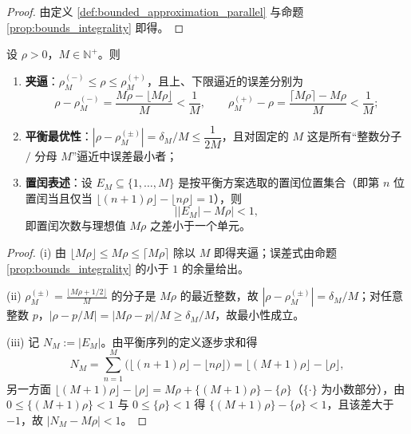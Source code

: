 \begin{proof}
由定义 \ref{def:bounded_approximation_parallel} 与命题 \ref{prop:bounds_integrality} 即得。
\end{proof}

\begin{theorem}[逼近误差的上下界]\label{thm:intercalation_error_bound_parallel}
设 $\rho>0$，$M\in\mathbb{N}^+$。则
\begin{enumerate}[label=(\roman*)]
    \item \textbf{夹逼}：$\rho^{(-)}_M\le\rho\le\rho^{(+)}_M$，且上、下限逼近的误差分别为
    \[
    \rho-\rho^{(-)}_M=\frac{M\rho-\lfloor M\rho\rfloor}{M}<\frac1M,
    \qquad
    \rho^{(+)}_M-\rho=\frac{\lceil M\rho\rceil-M\rho}{M}<\frac1M;
    \]
    \item \textbf{平衡最优性}：$|\rho-\rho^{(\pm)}_M|=\delta_M/M\le\dfrac{1}{2M}$，且对固定的 $M$ 这是所有“整数分子 $/$ 分母 $M$”逼近中误差最小者；
    \item \textbf{置闰表述}：设 $E_M\subseteq\{1,\dots,M\}$ 是按平衡方案选取的置闰位置集合（即第 $n$ 位置闰当且仅当 $\lfloor(n+1)\rho\rfloor-\lfloor n\rho\rfloor=1$），则
    \[
    \big||E_M|-M\rho\big|<1,
    \]
    即置闰次数与理想值 $M\rho$ 之差小于一个单元。
\end{enumerate}
\end{theorem}

\begin{proof}
(i) 由 $\lfloor M\rho\rfloor\le M\rho\le\lceil M\rho\rceil$ 除以 $M$ 即得夹逼；误差式由命题 \ref{prop:bounds_integrality} 的小于 $1$ 的余量给出。

(ii) $\rho^{(\pm)}_M=\frac{\lfloor M\rho+1/2\rfloor}{M}$ 的分子是 $M\rho$ 的最近整数，故 $|\rho-\rho^{(\pm)}_M|=\delta_M/M$；对任意整数 $p$，$|\rho-p/M|=|M\rho-p|/M\ge\delta_M/M$，故最小性成立。

(iii) 记 $N_M:=|E_M|$。由平衡序列的定义逐步求和得
\[
N_M=\sum_{n=1}^{M}\big(\lfloor(n+1)\rho\rfloor-\lfloor n\rho\rfloor\big)=\lfloor(M+1)\rho\rfloor-\lfloor\rho\rfloor,
\]
另一方面 $\lfloor(M+1)\rho\rfloor-\lfloor\rho\rfloor=M\rho+\{(M+1)\rho\}-\{\rho\}$（$\{\cdot\}$ 为小数部分），由 $0\le\{(M+1)\rho\}<1$ 与 $0\le\{\rho\}<1$ 得 $\{(M+1)\rho\}-\{\rho\}<1$，且该差大于 $-1$，故 $|N_M-M\rho|<1$。
\end{proof}

